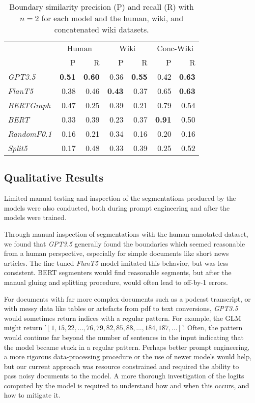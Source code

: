 \begin{table}[ht]
    \centering
    \begin{tabular}{@{}lrrrrrr@{}}
    \toprule
    & \multicolumn{2}{c}{Human} & \multicolumn{2}{c}{Wiki} & \multicolumn{2}{c}{Conc-Wiki} \\
    & P & R & P & R & P & R \\
    \midrule
    \it GPT3.5 & \bf 0.51 & \bf 0.60 & 0.36 & \bf 0.55 & 0.42 & \bf 0.63 \\
    \it FlanT5  & 0.38 & 0.46 & \bf 0.43 & 0.37 & 0.65 & \bf 0.63 \\
    \it BERTGraph & 0.47 & 0.25 & 0.39 & 0.21 & 0.79 & 0.54 \\
    \it BERT & 0.33 & 0.39 & 0.23 & 0.37 & \bf 0.91 & 0.50 \\
    \it RandomF0.1 & 0.16 & 0.21 & 0.34 & 0.16 & 0.20 & 0.16 \\
    \it Split5 & 0.17 & 0.48 & 0.33 & 0.39 & 0.25 & 0.52 \\
    \bottomrule
    \end{tabular}
    \caption{Boundary similarity precision (P) and recall (R) with $n=2$ for each model and the human, wiki, and concatenated wiki datasets.}\label{tab:quant_results_precision_recall}
   
\end{table}
    

\subsection{Qualitative Results}

Limited manual testing and inspection of the segmentations produced by the models were also conducted, both during prompt engineering and after the models were trained.

Through manual inspection of segmentations with the human-annotated dataset, we found that \emph{GPT3.5} generally found the boundaries which seemed reasonable from a human perspective, especially for simple documents like short news articles. The fine-tuned \emph{FlanT5} model imitated this behavior, but was less consistent. BERT segmenters would find reasonable segments, but after the manual gluing and splitting procedure, would often lead to off-by-1 errors.

For documents with far more complex documents such as a podcast transcript, or with messy data like tables or artefacts from pdf to text conversions, \emph{GPT3.5} would sometimes return indices with a regular pattern. For example, the GLM might return '$[1,15,22, \ldots, 76, 79, 82, 85, 88, \ldots, 184, 187, \ldots]$'. Often, the pattern would continue far beyond the number of sentences in the input indicating that the model became stuck in a regular pattern. Perhaps better prompt engineering, a more rigorous data-processing procedure or the use of newer models would help, but our current approach was resource constrained and required the ability to pass noisy documents to the model. A more thorough investigation of the logits computed by the model is required to understand how and when this occurs, and how to mitigate it.